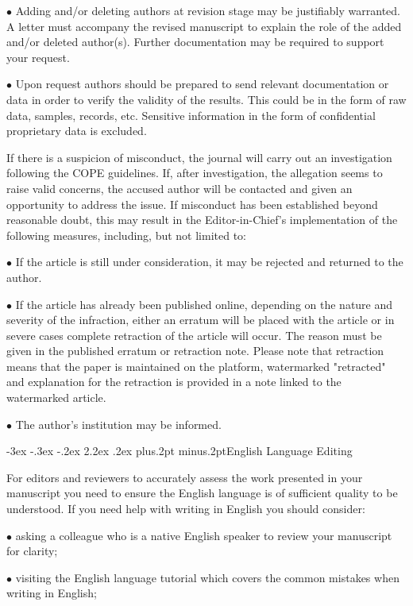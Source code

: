 \documentclass[twoside]{article}
\makeatletter
\def\section{\@startsection{section}{1}{\z@}%
 {-3ex \@plus -.3ex \@minus -.2ex}%
 {2.2ex \@plus.2ex}%
{\normalfont\normalsize\protect\baselineskip=14.5pt plus.2pt minus.2pt\bfseries}}
\makeatother
\begin{document}
\begin{multicols}{2}
$\bullet$ Adding and/or deleting authors at revision stage may be justifiably warranted. A letter must accompany the revised manuscript to explain the role of the added and/or deleted author(s). Further documentation may be required to support your request.

$\bullet$ Upon request authors should be prepared to send relevant documentation or data in order to verify the validity of the results. This could be in the form of raw data, samples, records, etc. Sensitive information in the form of confidential proprietary data is excluded.

If there is a suspicion of misconduct, the journal will carry out an investigation following the COPE guidelines. If, after investigation, the allegation seems to raise valid concerns, the accused author will be contacted and given an opportunity to address the issue. If misconduct has been established beyond reasonable doubt, this may result in the Editor-in-Chief's implementation of the following measures, including, but not limited to:

$\bullet$ If the article is still under consideration, it may be rejected and returned
to the author.

$\bullet$ If the article has already been published online, depending on the nature
and severity of the infraction, either an erratum will be placed with the
article or in severe cases complete retraction of the article will occur.
The reason must be given in the published erratum or retraction note. Please
note that retraction means that the paper is maintained on the platform,
watermarked "retracted" and explanation for the retraction is provided in a
note linked to the watermarked article.

$\bullet$ The author's institution may be informed.

\section{English Language Editing}

For editors and reviewers to accurately assess the work presented in your manuscript you need to ensure the English language is of sufficient quality to be understood. If you need help with writing in English you should consider:

$\bullet$ asking a colleague who is a native English speaker to review your manuscript for clarity;

$\bullet$ visiting the English language tutorial which covers the common mistakes when writing in English;


\end{multicols}
\end{document}
